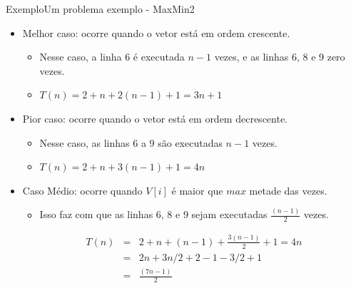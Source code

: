 \documentclass[aspectratio=169]{beamer}
\begin{document}
\begin{frame}{Exemplo}{Um problema exemplo - MaxMin2}
\begin{itemize}
\item Melhor caso: ocorre quando o vetor está em ordem crescente.
\begin{itemize}
\item Nesse caso, a linha 6 é executada $n-1$ vezes, e as linhas 6, 8 e 9 zero vezes.
\item $T(n) = 2 + n + 2(n-1) + 1 = 3n+1$
\end{itemize}
\item Pior caso: ocorre quando o vetor está em ordem decrescente.
\begin{itemize}
\item Nesse caso, as linhas 6 a 9 são executadas $n-1$ vezes.
\item $T(n) = 2 + n + 3(n-1) + 1 = 4n$
\end{itemize}
\item Caso Médio: ocorre quando $V[i]$ é maior que $max$ metade das vezes. 
\begin{itemize}
\item Isso faz com que as linhas 6, 8 e 9 sejam executadas $\frac{(n-1)}{2}$ vezes.
\end{itemize}
\begin{eqnarray}
T(n) &=& 2 + n + (n-1) + \frac{3(n-1)}{2} + 1 = 4n\nonumber \\
     &=& 2n + 3n/2 +2 -1 -3/2 + 1\nonumber \\
     &=& \frac{(7n - 1)}{2}\nonumber
\end{eqnarray}     
\end{itemize}
\end{frame}

\end{document}
